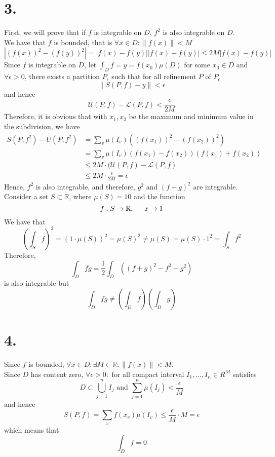 \documentclass[11pt]{article}
\begin{document}
\section*{3.}
First, we will prove that if $f$ is integrable on $D$, $f^2$ is also integrable on $D$. \\
We have that $f$ is bounded, that is $\forall x \in D: \| f(x) \| < M$
\[
|(f(x))^2 - (f(y))^2| = |f(x) - f(y)||f(x) + f(y)| \le 2M|f(x)-f(y)|
\]
Since $f$ is integrable on $D$, let $\int_D f = y = f(x_0) \mu(D)$ for some $x_0 \in D$ and $\forall \epsilon >0$, there exists a partition $P_\epsilon$ 
such that for all refinement $P$ of $P_\epsilon$
\[    
    \| S(P,f) - y \| < \epsilon
\]
and hence 
\[
    \mathcal{U}(P,f) - \mathcal{L}(P,f) < \frac{\epsilon}{2M}
\]
Therefore, it is obvious that with $x_1, x_2$ be the maximum and minimum value in the subdivision, we have
\begin{equation*}
    \begin{aligned}
    S(P,f^2) - U(P,f^2) &= \sum_{v} \mu(I_v)((f(x_1))^2 - (f(x_2))^2) \\
    &= \sum_{v} \mu(I_v)(f(x_1)-f(x_2))(f(x_1) + f(x_2)) \\
    &\le 2M \cdot (\mathcal{U}(P,f) - \mathcal{L}(P,f) \\
    &\le 2M \cdot \frac{\epsilon}{2M} = \epsilon
    \end{aligned}
\end{equation*}
Hence, $f^2$ is also integrable, and therefore, $g^2$ and $(f+g)^2$ are integrable. \\
Consider a set $S \subset \mathbb{R}$, where $\mu(S) = 10$ and the function
\[
f: S \to \mathbb{R}, \indent x \to 1
\]
We have that 
\[
\left(\int_S f \right)^2 = (1 \cdot \mu(S))^2 = \mu(S)^2 \ne \mu(S) = \mu(S) \cdot 1^2 = \int_S f^2
\]
Therefore, 
\[
    \int_D fg = \frac{1}{2} \int_D \left((f+g)^2 - f^2 - g^2 \right)
\]
is also integrable but
\[
    \int_D fg \ne \left(\int_D f\right)  \left(\int_D g\right)   
\]
\pagebreak
\section*{4.}
Since $f$ is bounded, $\forall x \in D: \exists M \in \mathbb{R}:  \|f(x) \| < M$. \\
Since $D$ has content zero, $\forall \epsilon >0:$ for all compact interval $I_1, \ldots, I_n \in R^M$ satisfies  
\[
    D \subset \bigcup_{j=1}^n I_j \text{ and } \sum_{j=1}^n \mu(I_j) < \frac{\epsilon}{M}
\]
and hence
\[
S(P,f) = \sum_v f(x_v) \mu(I_v) \le \frac{\epsilon}{M} \cdot M = \epsilon
\]
which means that 
\[
    \int_D f = 0    
\]
\pagebreak
\end{document}
